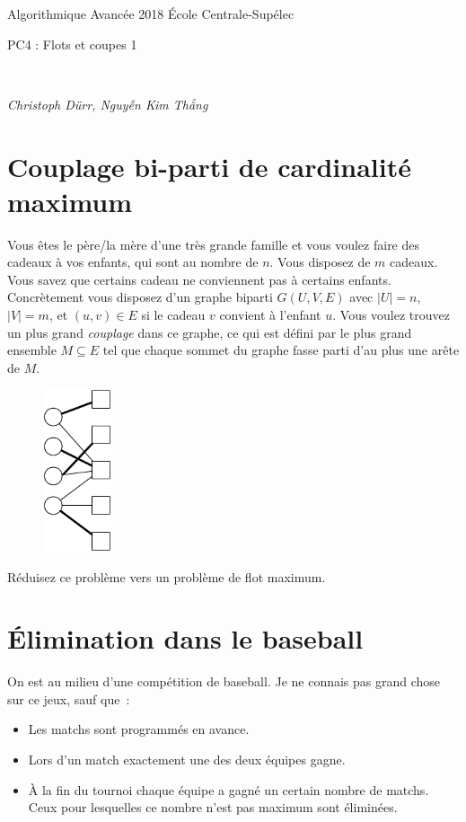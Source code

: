 \documentclass[12pt]{article}
\newcommand{\MakeScribeTop}[1]{
\noindent
\begin{framed}
\noindent
 Algorithmique Avancée 2018
 \hfill
 École Centrale-Supélec
 \\[1em]
 \centerline{ \Large
#1
 }
 \\[1em]
\centerline{  \it Christoph Dürr, Nguyễn Kim Thắng}
\end{framed}
}
\begin{document}
    \MakeScribeTop{PC4 : Flots et coupes 1}

\section{Couplage bi-parti de cardinalité maximum}

Vous êtes le père/la mère d'une très grande famille et vous voulez faire des cadeaux à vos enfants, qui sont au nombre de $n$.  Vous disposez de $m$ cadeaux.  Vous savez que certains cadeau ne conviennent pas à certains enfants. Concrètement vous disposez d'un graphe biparti $G(U,V,E)$ avec $|U|=n$, $|V|=m$, et $(u,v)\in E$ si le cadeau $v$ convient à l'enfant $u$.  Vous voulez trouvez un plus grand \emph{couplage} dans ce graphe, ce qui est défini par le plus grand ensemble $M\subseteq E$ tel que chaque sommet du graphe fasse parti d'au plus une arête de $M$. 


\begin{figure}[h]
	\centerline{\includegraphics[width=2cm]{couplage.pdf}}
\end{figure}


Réduisez ce problème vers un problème de flot maximum.


\section{Élimination dans le baseball}


On est au milieu d'une compétition de baseball.
Je ne connais pas grand chose sur ce jeux, sauf que~:
\begin{itemize}
	\item Les matchs sont programmés en avance.
	\item Lors d'un match exactement une des deux équipes gagne.
	\item À la fin du tournoi chaque équipe a gagné un certain nombre de matchs. Ceux pour lesquelles ce nombre n'est pas maximum sont éliminées.
\end{itemize}
\end{document}
